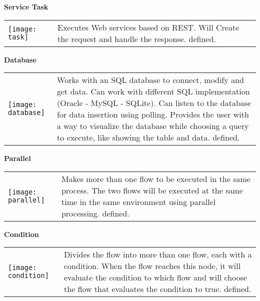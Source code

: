 \par\vspace {1cm}

\large \textbf{Service Task}\\

\begin{tabular}{C{2.2cm}  L{15cm}}
    \texttt{[image: task]} & Executes Web services based on REST.
    \linebreak Will Create the request and handle the response.
defined.
\end{tabular}

\par\vspace {1cm}

\large \textbf{Database}\\

\begin{tabular}{C{2.2cm}  L{15cm}}
    \texttt{[image: database]} & Works with an SQL database to connect, modify and get data.
    \linebreak Can work with different SQL implementation (Oracle - MySQL - SQLite).
    \linebreak Can listen to the database for data insertion using polling.
    \linebreak Provides the user with a way to visualize the database while choosing a
    query to execute, like showing the table and data.
defined.
\end{tabular}

\par\vspace {1cm}

\large \textbf{Parallel}\\

\begin{tabular}{C{2.2cm}  L{15cm}}
    \texttt{[image: parallel]} & Makes more than one flow to be executed in the same process.
    \linebreak The two flows will be executed at the same time in the same environment
    using parallel processing.
defined.
\end{tabular}

\par\vspace {1cm}

\large \textbf{Condition}\\

\begin{tabular}{C{2.2cm}  L{15cm}}
    \texttt{[image: condition]} & Divides the flow into more than one flow, each with a condition.
    \linebreak When the flow reaches this node, it will evaluate the condition to which
    flow and will choose the flow that evaluates the condition to true.
defined.
\end{tabular}

